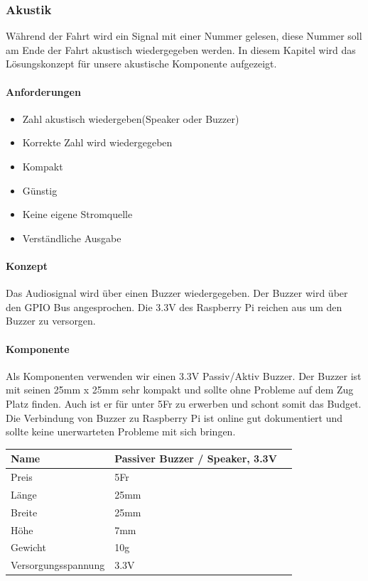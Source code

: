 \documentclass[../../main.tex]{subfiles}
\begin{document}
\subsubsection{Akustik}
Während der Fahrt wird ein Signal mit einer Nummer gelesen, diese Nummer soll am Ende der Fahrt akustisch wiedergegeben werden. In diesem Kapitel wird das Lösungskonzept für unsere akustische Komponente aufgezeigt.

\paragraph{Anforderungen}
\begin{itemize}
    \item Zahl akustisch wiedergeben(Speaker oder Buzzer)
    \item Korrekte Zahl wird wiedergegeben
    \item Kompakt
    \item Günstig
    \item Keine eigene Stromquelle
    \item Verständliche Ausgabe
\end{itemize}

\paragraph{Konzept}
Das Audiosignal wird über einen Buzzer wiedergegeben. Der Buzzer wird über den GPIO Bus angesprochen. Die 3.3V des Raspberry Pi reichen aus um den Buzzer zu versorgen.

\paragraph{Komponente}
Als Komponenten verwenden wir einen 3.3V Passiv/Aktiv Buzzer. Der Buzzer ist mit seinen 25mm x 25mm sehr kompakt und sollte ohne Probleme auf dem Zug Platz finden. Auch ist er für unter 5Fr zu erwerben und schont somit das Budget. Die Verbindung von Buzzer zu Raspberry Pi ist online gut dokumentiert und sollte keine unerwarteten Probleme mit sich bringen.

\begin{table}[H]
\begin{flushleft}
\begin{tabular}{lll}
Name & Passiver Buzzer / Speaker, 3.3V \\ \hline
Preis & 5Fr     \\ \hline
Länge & 25mm    \\ \hline
Breite & 25mm   \\ \hline
Höhe & 7mm      \\ \hline
Gewicht & 10g   \\ \hline
Versorgungsspannung & 3.3V \\ \hline
\end{tabular}
\end{flushleft}
\end{table}
\end{document}
